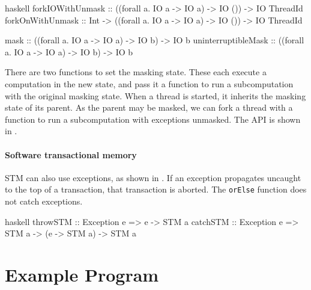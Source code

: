 \begin{listing}
\centering
\begin{cminted}{haskell}
forkIOWithUnmask    :: ((forall a. IO a -> IO a) -> IO ()) -> IO ThreadId
forkOnWithUnmask    :: Int -> ((forall a. IO a -> IO a) -> IO ()) -> IO ThreadId

mask                :: ((forall a. IO a -> IO a) -> IO b) -> IO b
uninterruptibleMask :: ((forall a. IO a -> IO a) -> IO b) -> IO b
\end{cminted}
\caption{Masking exceptions in Haskell.}\label{lst:excm_haskell}
\end{listing}

There are two functions to set the masking state.  These each execute
a computation in the new state, and pass it a function to run a
subcomputation with the original masking state.  When a thread is
started, it inherits the masking state of its parent.  As the parent
may be masked, we can fork a thread with a function to run a
subcomputation with exceptions unmasked.  The API is shown in
.

\paragraph{Software transactional memory}
STM can also use exceptions, as shown in .
If an exception propagates uncaught to the top of a transaction, that
transaction is aborted.  The \verb|orElse| function does not catch
exceptions.

\begin{listing}
\centering
\begin{cminted}{haskell}
throwSTM :: Exception e => e -> STM a
catchSTM :: Exception e => STM a -> (e -> STM a) -> STM a
\end{cminted}
\caption{STM exceptions in Haskell.}\label{lst:excstm_haskell}
\end{listing}

\section{Example Program}
\label{sec:concurrent_haskell-example}

\begin{listing}
\centering
{}
\caption[A simple alarm program.]{A simple alarm program.  Adapted from~\cite{marlow2013}.}\label{lst:ch_ex1}
\end{listing}


